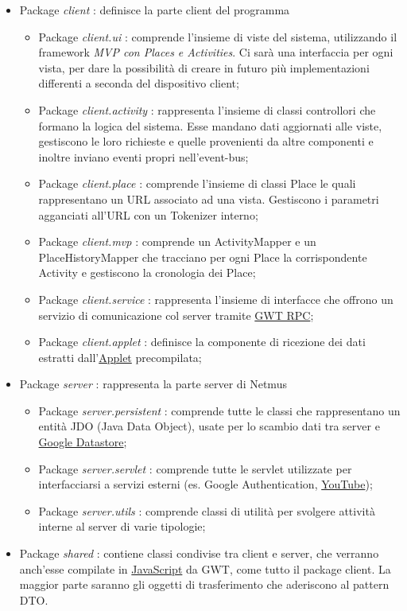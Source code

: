 \begin{itemize}
  \item Package \emph{client} : definisce la parte client del programma
  \begin {itemize}
    \item Package \emph{client.ui} : comprende l'insieme di viste del sistema,
    utilizzando il framework \emph{MVP con Places e Activities}. Ci sar\`a una
    interfaccia per ogni vista, per dare la possibilit\`a di creare in futuro
    pi\`u implementazioni differenti a seconda del dispositivo client;
    \item Package \emph{client.activity} : rappresenta l'insieme di classi
    controllori che formano la logica del sistema. Esse mandano dati aggiornati alle
    viste, gestiscono le loro richieste e quelle provenienti da altre componenti
    e inoltre inviano eventi propri nell'event-bus;
    \item Package \emph{client.place} : comprende l'insieme di classi Place le
    quali rappresentano un URL associato ad una vista. Gestiscono i parametri
    agganciati all'URL con un Tokenizer interno;
    \item Package \emph{client.mvp} : comprende un ActivityMapper e
    un PlaceHistoryMapper che tracciano per ogni Place la corrispondente
    Activity e gestiscono la cronologia dei Place;
    \item Package \emph{client.service} : rappresenta l'insieme di interfacce
    che offrono un servizio di comunicazione col server tramite \underline{GWT
    RPC};
    \item Package \emph{client.applet} : definisce la componente di
    ricezione dei dati estratti dall'\underline{Applet} precompilata;
  \end {itemize}
  \item Package \emph{server} : rappresenta la parte server di Netmus
  \begin{itemize}
    \item Package \emph{server.persistent} : comprende tutte le classi che
    rappresentano un entit\`a JDO (Java Data Object), usate per lo scambio dati tra
    server e \underline{Google Datastore};
    \item Package \emph{server.servlet} : comprende tutte le servlet utilizzate
    per interfacciarsi a servizi esterni (es. Google Authentication,
    \underline{YouTube});
    \item Package \emph{server.utils} : comprende classi di utilit\`a per
    svolgere attivit\`a interne al server di varie tipologie;
  \end{itemize}
  \item Package \emph{shared} :  contiene classi condivise tra client e server,
  che verranno anch'esse compilate in \underline{JavaScript} da GWT, come tutto
  il package client. La maggior parte saranno gli oggetti di trasferimento che
  aderiscono al pattern DTO.
\end{itemize}

